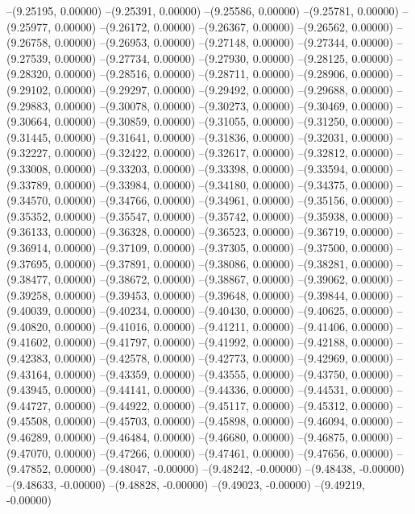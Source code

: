 --(9.25195, 0.00000)
--(9.25391, 0.00000)
--(9.25586, 0.00000)
--(9.25781, 0.00000)
--(9.25977, 0.00000)
--(9.26172, 0.00000)
--(9.26367, 0.00000)
--(9.26562, 0.00000)
--(9.26758, 0.00000)
--(9.26953, 0.00000)
--(9.27148, 0.00000)
--(9.27344, 0.00000)
--(9.27539, 0.00000)
--(9.27734, 0.00000)
--(9.27930, 0.00000)
--(9.28125, 0.00000)
--(9.28320, 0.00000)
--(9.28516, 0.00000)
--(9.28711, 0.00000)
--(9.28906, 0.00000)
--(9.29102, 0.00000)
--(9.29297, 0.00000)
--(9.29492, 0.00000)
--(9.29688, 0.00000)
--(9.29883, 0.00000)
--(9.30078, 0.00000)
--(9.30273, 0.00000)
--(9.30469, 0.00000)
--(9.30664, 0.00000)
--(9.30859, 0.00000)
--(9.31055, 0.00000)
--(9.31250, 0.00000)
--(9.31445, 0.00000)
--(9.31641, 0.00000)
--(9.31836, 0.00000)
--(9.32031, 0.00000)
--(9.32227, 0.00000)
--(9.32422, 0.00000)
--(9.32617, 0.00000)
--(9.32812, 0.00000)
--(9.33008, 0.00000)
--(9.33203, 0.00000)
--(9.33398, 0.00000)
--(9.33594, 0.00000)
--(9.33789, 0.00000)
--(9.33984, 0.00000)
--(9.34180, 0.00000)
--(9.34375, 0.00000)
--(9.34570, 0.00000)
--(9.34766, 0.00000)
--(9.34961, 0.00000)
--(9.35156, 0.00000)
--(9.35352, 0.00000)
--(9.35547, 0.00000)
--(9.35742, 0.00000)
--(9.35938, 0.00000)
--(9.36133, 0.00000)
--(9.36328, 0.00000)
--(9.36523, 0.00000)
--(9.36719, 0.00000)
--(9.36914, 0.00000)
--(9.37109, 0.00000)
--(9.37305, 0.00000)
--(9.37500, 0.00000)
--(9.37695, 0.00000)
--(9.37891, 0.00000)
--(9.38086, 0.00000)
--(9.38281, 0.00000)
--(9.38477, 0.00000)
--(9.38672, 0.00000)
--(9.38867, 0.00000)
--(9.39062, 0.00000)
--(9.39258, 0.00000)
--(9.39453, 0.00000)
--(9.39648, 0.00000)
--(9.39844, 0.00000)
--(9.40039, 0.00000)
--(9.40234, 0.00000)
--(9.40430, 0.00000)
--(9.40625, 0.00000)
--(9.40820, 0.00000)
--(9.41016, 0.00000)
--(9.41211, 0.00000)
--(9.41406, 0.00000)
--(9.41602, 0.00000)
--(9.41797, 0.00000)
--(9.41992, 0.00000)
--(9.42188, 0.00000)
--(9.42383, 0.00000)
--(9.42578, 0.00000)
--(9.42773, 0.00000)
--(9.42969, 0.00000)
--(9.43164, 0.00000)
--(9.43359, 0.00000)
--(9.43555, 0.00000)
--(9.43750, 0.00000)
--(9.43945, 0.00000)
--(9.44141, 0.00000)
--(9.44336, 0.00000)
--(9.44531, 0.00000)
--(9.44727, 0.00000)
--(9.44922, 0.00000)
--(9.45117, 0.00000)
--(9.45312, 0.00000)
--(9.45508, 0.00000)
--(9.45703, 0.00000)
--(9.45898, 0.00000)
--(9.46094, 0.00000)
--(9.46289, 0.00000)
--(9.46484, 0.00000)
--(9.46680, 0.00000)
--(9.46875, 0.00000)
--(9.47070, 0.00000)
--(9.47266, 0.00000)
--(9.47461, 0.00000)
--(9.47656, 0.00000)
--(9.47852, 0.00000)
--(9.48047, -0.00000)
--(9.48242, -0.00000)
--(9.48438, -0.00000)
--(9.48633, -0.00000)
--(9.48828, -0.00000)
--(9.49023, -0.00000)
--(9.49219, -0.00000)
